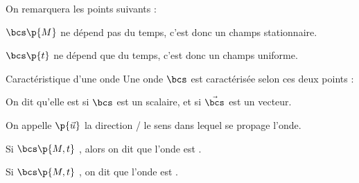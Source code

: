     On remarquera les points suivants :
    \begin{enumerate}
        \itt $\bcs\p{M}$ ne dépend pas du temps, c'est donc un champs stationnaire.
        
        \itt $\bcs\p{t}$ ne dépend que du temps, c'est donc un champs uniforme.
    \end{enumerate}
    
    \begin{definition}{Caractéristique d'une onde}{}
        Une onde $\bcs$ est caractérisée selon ces deux points :
        \begin{psse}
            \item On dit qu'elle est  si $\bcs$ est un scalaire, et  si $\vec{\bcs}$ est un vecteur.
        
            \item On appelle  $\p{\vec{u}}$ la direction / le sens dans lequel se propage l'onde.

            Si $\bcs\p{M,t}$ , alors on dit  que l'onde est .
            
            Si $\bcs\p{M,t}$ , on dit que l'onde est .
        \end{psse}
    \end{definition}

